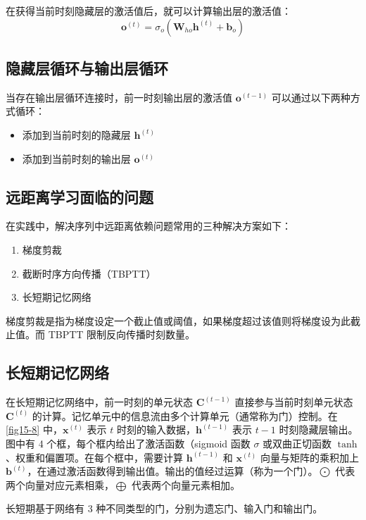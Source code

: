 在获得当前时刻隐藏层的激活值后，就可以计算输出层的激活值：
\begin{equation}
    \bm{o}^{(t)}=\sigma_o(\bm{W}_{ho}\bm{h}^{(t)}+\bm{b}_o)
\end{equation}
\subsection{隐藏层循环与输出层循环}
当存在输出层循环连接时，前一时刻输出层的激活值  $\bm{o}^{(t-1)}$ 可以通过以下两种方式循环：
\begin{itemize}
    \item 添加到当前时刻的隐藏层 $\bm{h}^{(t)}$
    \item 添加到当前时刻的输出层 $\bm{o}^{(t)}$
\end{itemize}
\subsection{远距离学习面临的问题}
在实践中，解决序列中远距离依赖问题常用的三种解决方案如下：
\begin{enumerate}
    \item 梯度剪裁
    \item 截断时序方向传播（TBPTT）
    \item 长短期记忆网络
\end{enumerate}

梯度剪裁是指为梯度设定一个截止值或阈值，如果梯度超过该值则将梯度设为此截止值。而 TBPTT 限制反向传播时刻数量。
\subsection{长短期记忆网络}
在长短期记忆网络中，前一时刻的单元状态 $\bm{C}^{(t-1)}$ 直接参与当前时刻单元状态 $\bm{C}^{(t)}$ 的计算。记忆单元中的信息流由多个计算单元（通常称为门）控制。在 \autoref{fig15-8} 中，$\bm{x}^{(t)}$ 表示 $t$ 时刻的输入数据，$\bm{h}^{(t-1)}$ 表示 $t-1$ 时刻隐藏层输出。图中有 4 个框，每个框内给出了激活函数（sigmoid 函数 $\sigma$ 或双曲正切函数 $\tanh$、权重和偏置项。在每个框中，需要计算 $\bm{h}^{(t-1)}$ 和 $\bm{x}^{(t)}$ 向量与矩阵的乘积加上 $\bm{b}^{(t)}$，在通过激活函数得到输出值。输出的值经过运算（称为一个门）。$\bigodot$ 代表两个向量对应元素相乘，$\bigoplus$ 代表两个向量元素相加。

长短期基于网络有 3 种不同类型的门，分别为遗忘门、输入门和输出门。

